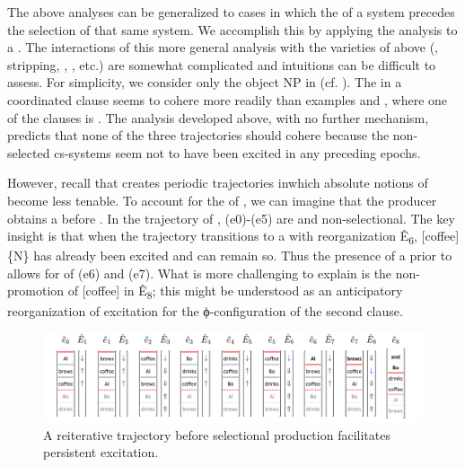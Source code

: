 The above analyses can be generalized to cases in which the  of a system precedes the selection of that same system. We accomplish this by applying the  analysis to a . The interactions of this more general analysis with the varieties of  above (, stripping,  , , etc.) are somewhat complicated and intuitions can be difficult to assess. For simplicity, we consider only the object NP  in  (cf. \citealt{Wilder1997}). The  in a coordinated clause  seems to cohere more readily than examples  and , where one of the clauses is . The  analysis developed above, with no further mechanism, predicts that none of the three trajectories should cohere because the non-selected cs-systems seem not to have been excited in any preceding epochs.

\ea\label{ex:7:7}
\label{ex:7:7a}
\label{ex:7:7b}
\label{ex:7:7c}
\z
\z

  However, recall that  creates periodic trajectories in\linebreak which absolute notions of  become less tenable. To account for the  of , we can imagine that the producer obtains a  before . In the trajectory of {}, (e0)-(e5) are  and non-selectional. The key insight is that when the trajectory transitions to a  with reorganization Ê\textsubscript{6}, [coffee]\{N\} has already been excited and can remain so. Thus the presence of a  prior to  allows for  of (e6) and (e7). What is more challenging to explain is the non-promotion of [coffee] in Ê\textsubscript{8}; this might be understood as an anticipatory reorganization of excitation for the ϕ-con\-fig\-u\-ra\-tion of the second clause.

  
\begin{figure}
\includegraphics[width=\textwidth]{figures/Tilsen-img150.png}
\caption{A reiterative trajectory before selectional production facilitates persistent excitation.}
\label{fig:7:6}
\end{figure}
 

